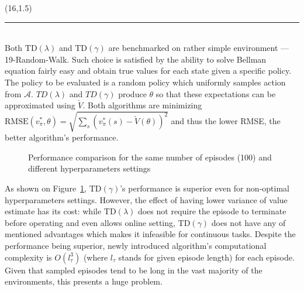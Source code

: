\documentclass[a0]{a0poster}
\def\Head#1{\noindent{\LARGE\color{bluegray} #1}\bigskip}
\begin{document}
\begin{textblock}{7.0}(16,1.5)

\medskip
\hrule\medskip
\Head{Experiment}\\

Both $\text{TD}(\lambda)$ and $\text{TD}(\gamma)$ are benchmarked on rather
simple environment --- 19-Random-Walk. Such choice is satisfied by the ability
to solve Bellman equation fairly easy and obtain true values for each state
given a specific policy. The policy to be evaluated is a random policy which
uniformly samples action from $\mathcal{A}$. $TD(\lambda)$ and $TD(\gamma)$
produce $\theta$ so that these expectations can be approximated using
$\check{V}$. Both algorithms are minimizing $\text{RMSE}(v_\pi^*, \theta) =
\sqrt{\sum_{s} {(v_\pi^*(s) - \check{V}(\theta))}^2}$ and thus the lower RMSE,
the better algorithm's performance.

\begin{center}
\begin{figure}%
    \centering
    \qquad
    \caption{Performance comparison for the same number of episodes (100) and
             different hyperparameters settings}%
    \label{fig:results}%
\end{figure}
\end{center}

As shown on Figure~\ref{fig:results}, $\text{TD}(\gamma)$'s performance is
superior even for non-optimal hyperparameters settings. However, the effect of
having lower variance of value estimate has its cost: while
$\text{TD}(\lambda)$ does not require the episode to terminate before operating
and even allows online setting, $\text{TD}(\gamma)$ does not have any of
mentioned advantages which makes it infeasible for continuous tasks. Despite
the performance being superior, newly introduced algorithm's computational
complexity is $O(l_{\tau}^3)$ (where $l_\tau$ stands for given episode length)
for each episode. Given that sampled episodes tend to be long in the vast
majority of the environments, this presents a huge problem.


\end{textblock}
\end{document}
